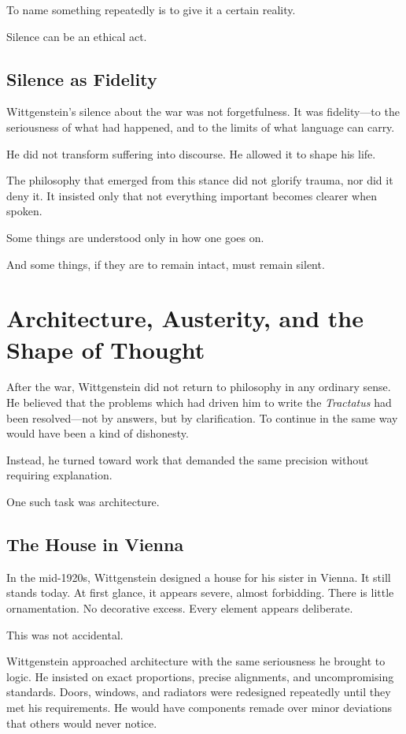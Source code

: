 \documentclass[11pt]{article}
\begin{document}
To name something repeatedly is to give it a certain reality.

Silence can be an ethical act.

\subsection*{Silence as Fidelity}

Wittgenstein’s silence about the war was not forgetfulness. It was fidelity—to the seriousness of what had happened, and to the limits of what language can carry.

He did not transform suffering into discourse. He allowed it to shape his life.

The philosophy that emerged from this stance did not glorify trauma, nor did it deny it. It insisted only that not everything important becomes clearer when spoken.

Some things are understood only in how one goes on.

And some things, if they are to remain intact, must remain silent.

\section*{Architecture, Austerity, and the Shape of Thought}

After the war, Wittgenstein did not return to philosophy in any ordinary sense. He believed that the problems which had driven him to write the \emph{Tractatus} had been resolved—not by answers, but by clarification. To continue in the same way would have been a kind of dishonesty.

Instead, he turned toward work that demanded the same precision without requiring explanation.

One such task was architecture.

\subsection*{The House in Vienna}

In the mid-1920s, Wittgenstein designed a house for his sister in Vienna. It still stands today. At first glance, it appears severe, almost forbidding. There is little ornamentation. No decorative excess. Every element appears deliberate.

This was not accidental.

Wittgenstein approached architecture with the same seriousness he brought to logic. He insisted on exact proportions, precise alignments, and uncompromising standards. Doors, windows, and radiators were redesigned repeatedly until they met his requirements. He would have components remade over minor deviations that others would never notice.
\end{document}

